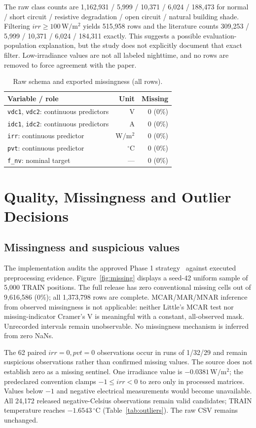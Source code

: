\documentclass[conference]{IEEEtran}
\begin{document}
The raw class counts are 1,162,931 / 5,999 / 10,371 / 6,024 / 188,473 for normal / short circuit / resistive degradation / open circuit / natural building shade. Filtering $irr\geq100\,\mathrm{W/m^2}$ yields 515,958 rows and the literature counts 309,253 / 5,999 / 10,371 / 6,024 / 184,311 exactly. This suggests a possible evaluation-population explanation, but the study does not explicitly document that exact filter. Low-irradiance values are not all labeled nighttime, and no rows are removed to force agreement with the paper.
\begin{table}[!t]
\caption{Raw schema and exported missingness (all rows).}\label{tab:data}
\centering\footnotesize
\begin{tabularx}{\columnwidth}{Yrr}
\toprule
Variable / role & Unit & Missing \\ \midrule
\texttt{vdc1}, \texttt{vdc2}: continuous predictors & V & 0 (0\%) \\
\texttt{idc1}, \texttt{idc2}: continuous predictors & A & 0 (0\%) \\
\texttt{irr}: continuous predictor & $\mathrm{W/m^2}$ & 0 (0\%) \\
\texttt{pvt}: continuous predictor & $^\circ$C & 0 (0\%) \\
\texttt{f\_nv}: nominal target & --- & 0 (0\%) \\
\bottomrule
\end{tabularx}
\end{table}

\section{Quality, Missingness and Outlier Decisions}
\subsection{Missingness and suspicious values}
The implementation audits the approved Phase 1 strategy~\cite{phase1} against executed preprocessing evidence.
Figure~\ref{fig:missing} displays a seed-42 uniform sample of 5,000 TRAIN positions. The full release has zero conventional missing cells out of 9,616,586 (0\%); all 1,373,798 rows are complete. MCAR/MAR/MNAR inference from observed missingness is not applicable: neither Little's MCAR test nor missing-indicator Cramer's V is meaningful with a constant, all-observed mask. Unrecorded intervals remain unobservable. No missingness mechanism is inferred from zero NaNs.

The 62 paired $irr=0,pvt=0$ observations occur in runs of 1/32/29 and remain suspicious observations rather than confirmed missing values. The source does not establish zero as a missing sentinel. One irradiance value is $-0.0381\,\mathrm{W/m^2}$; the predeclared convention clamps $-1\leq irr<0$ to zero only in processed matrices. Values below $-1$ and negative electrical measurements would become unavailable. All 24,172 released negative-Celsius observations remain valid candidates; TRAIN temperature reaches $-1.6543\,{}^\circ$C (Table~\ref{tab:outliers}). The raw CSV remains unchanged.
\end{document}
